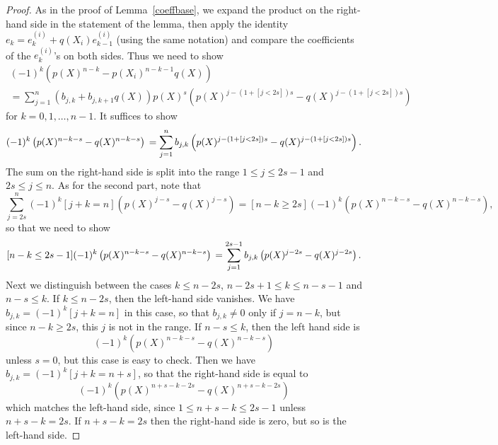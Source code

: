 \documentclass[10pt,a4paper]{amsart}
\begin{document}
\begin{proof}
As in the proof of Lemma~\ref{coeffbase}, we expand the product on the right-hand side in the statement of the lemma, then apply 
the identity $e_k=e_k^{(i)}+q(X_i) e_{k-1}^{(i)}$ (using the same notation) and compare the coefficients of 
the $e^{(i)}_k$'s on both sides. Thus we need to show 
\begin{multline*} 
(-1)^{k} \left(p(X)^{n-k}-p(X_i)^{n-k-1} q(X) \right) \\
=
\sum_{j=1}^n (b_{j,k}+b_{j,k+1}q(X)) p(X)^{s} \left( p(X)^{j-(1+[j<2s])s}-q(X)^{j-(1+[j<2s])s} \right)
\end{multline*} 
for $k=0,1,\ldots,n-1$. It suffices to show 
$$ 
(-1)^{k} \left(p(X)^{n-k-s}-q(X)^{n-k-s} \right) \\
=
\sum_{j=1}^n b_{j,k} \left( p(X)^{j-(1+[j<2s])s}-q(X)^{j-(1+[j<2s])s} \right).
$$
The sum on the right-hand side is split into the range $1 \le j \le 2s-1$ and $2s \le j \le n$. 
As for the second part, note that 
$$
\sum_{j=2s}^n (-1)^k [j+k=n] \left( p(X)^{j-s}-q(X)^{j-s} \right)
= [n-k \ge 2s] (-1)^k \left( p(X)^{n-k-s}-q(X)^{n-k-s} \right),
$$
so that we need to show 
$$ 
[n-k \le 2s-1] (-1)^{k} \left(p(X)^{n-k-s}-q(X)^{n-k-s} \right) \\
=
\sum_{j=1}^{2s-1} b_{j,k} \left( p(X)^{j-2s}-q(X)^{j-2s} \right).
$$
Next we distinguish between the cases $k \le n-2s$, $n-2s+1 \le k \le n-s-1$ and $n-s \le k$.
If $k \le n-2s$, then the left-hand side vanishes. We have $b_{j,k}=(-1)^k [j+k=n]$ in this case, so that 
$b_{j,k} \not= 0$ only if $j=n-k$, but since $n-k \ge 2s$, this $j$ is not in the range. If 
$n-s \le k$, then the left hand side is 
$$
(-1)^{k} \left(p(X)^{n-k-s}-q(X)^{n-k-s} \right) 
$$ 
unless $s=0$, but this case is easy to check. Then we have $b_{j,k}=(-1)^k [j+k=n+s]$, so that the 
right-hand side is equal to 
$$
(-1)^k \left( p(X)^{n+s-k-2s}-q(X)^{n+s-k-2s} \right)
$$
which matches the left-hand side, 
since $1 \le n+s-k \le 2s-1$ unless $n+s-k=2s$. If $n+s-k=2s$ then the right-hand side is zero, but so is the left-hand side.


\end{proof}
\end{document}
